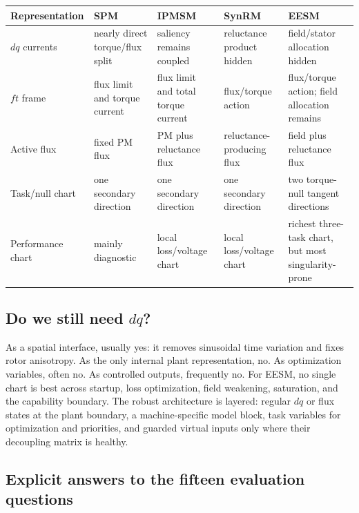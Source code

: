 \begin{center}
\label{tab:machine-representation-map}
\small
\begin{tabularx}{\linewidth}{lXXXX}
\toprule
Representation & SPM & IPMSM & SynRM & EESM\\
\midrule
\(dq\) currents & nearly direct torque/flux split & saliency remains coupled & reluctance product hidden & field/stator allocation hidden\\
\(ft\) frame & flux limit and torque current & flux limit and total torque current & flux/torque action & flux/torque action; field allocation remains\\
Active flux & fixed PM flux & PM plus reluctance flux & reluctance-producing flux & field plus reluctance flux\\
Task/null chart & one secondary direction & one secondary direction & one secondary direction & two torque-null tangent directions\\
Performance chart & mainly diagnostic & local loss/voltage chart & local loss/voltage chart & richest three-task chart, but most singularity-prone\\
\bottomrule
\end{tabularx}
\end{center}

\subsection{Do we still need \texorpdfstring{\(dq\)}{dq}?}

As a spatial interface, usually yes: it removes sinusoidal time variation and
fixes rotor anisotropy. As the only internal plant representation, no. As
optimization variables, often no. As controlled outputs, frequently no. For
EESM, no single chart is best across startup, loss optimization, field
weakening, saturation, and the capability boundary. The robust architecture
is layered: regular \(dq\) or flux states at the plant boundary, a
machine-specific model block, task variables for optimization and priorities,
and guarded virtual inputs only where their decoupling matrix is healthy.

\subsection{Explicit answers to the fifteen evaluation questions}

